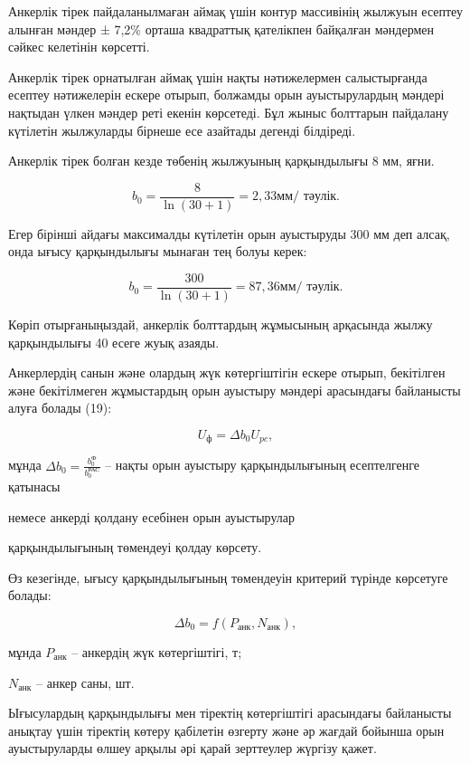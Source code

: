 \begin{multicols}{2}
Анкерлік тірек пайдаланылмаған аймақ үшін контур массивінің жылжуын
есептеу алынған мәндер ± 7,2\% орташа квадраттық қателікпен байқалған
мәндермен сәйкес келетінін көрсетті.

Анкерлік тірек орнатылған аймақ үшін нақты нәтижелермен салыстырғанда
есептеу нәтижелерін ескере отырып, болжамды орын ауыстырулардың мәндері
нақтыдан үлкен мәндер реті екенін көрсетеді. Бұл жыныс болттарын
пайдалану күтілетін жылжуларды бірнеше есе азайтады дегенді білдіреді.

Анкерлік тірек болған кезде төбенің жылжуының қарқындылығы 8 мм, яғни.

\[b_{0} = \frac{8}{\ln(30 + 1)} = 2,33 \text{мм/ тәулік.}\]

Егер бірінші айдағы максималды күтілетін орын ауыстыруды 300 мм деп
алсақ, онда ығысу қарқындылығы мынаған тең болуы керек:

\[b_{0} = \frac{300}{\ln(30 + 1)} = 87,36 \text{мм/ тәулік.}\]

Көріп отырғаныңыздай, анкерлік болттардың жұмысының арқасында жылжу
қарқындылығы 40 есеге жуық азаяды.

Анкерлердің санын және олардың жүк көтергіштігін ескере отырып,
бекітілген және бекітілмеген жұмыстардың орын ауыстыру мәндері
арасындағы байланысты алуға болады (19):

\begin{equation}
U_{ф} = \Delta b_{0}U_{pc},
\end{equation}

мұнда \(\Delta b_{0} = \frac{b_{0}^{\text{Ф}}}{b_{0}^{\text{РАС}}}\) -- нақты орын
ауыстыру қарқындылығының есептелгенге қатынасы

немесе анкерді қолдану есебінен орын ауыстырулар

қарқындылығының төмендеуі қолдау көрсету.

Өз кезегінде, ығысу қарқындылығының төмендеуін критерий түрінде
көрсетуге болады:

\begin{equation}
\Delta b_{0} = f(P_{\text{анк}},N_{\text{анк}}),
\end{equation}

мұнда \(P_{\text{анк}}\) -- анкердің жүк көтергіштігі, т;

\(N_{\text{анк}}\) -- анкер саны, шт.

Ығысулардың қарқындылығы мен тіректің көтергіштігі арасындағы байланысты
анықтау үшін тіректің көтеру қабілетін өзгерту және әр жағдай бойынша
орын ауыстыруларды өлшеу арқылы әрі қарай зерттеулер жүргізу қажет.


\end{multicols}
